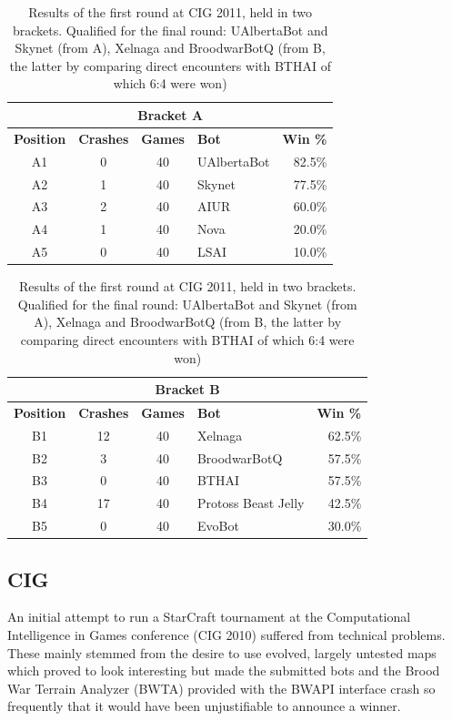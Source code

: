 \documentclass[journal]{IEEEtran}
\begin{document}
\begin{table}[!t]
\caption{Results of the first round at CIG 2011, held in two brackets.
Qualified for the final round: UAlbertaBot and Skynet (from A), Xelnaga
and BroodwarBotQ (from B, the latter by comparing direct encounters
with BTHAI of which 6:4 were won)}
\label{tab:cig-first-round}
\centering
\begin{tabular}{|c|c|c|l|r|}
\hline
\multicolumn{5}{|c|}{Bracket A} \\ \hline
{\bfseries Position} & {\bfseries Crashes} & {\bfseries Games} & {\bfseries Bot} & {\bfseries Win \%} \\
\hline
A1 & 0 &   40 &  UAlbertaBot & 82.5\% \\
A2 & 1 &     40 &  Skynet   &  77.5\% \\
A3 & 2 &   40 &  AIUR   &  60.0\% \\
A4 & 1 &   40 &  Nova   &  20.0\% \\
A5 & 0 &   40 &  LSAI   &  10.0\%\\
\hline
\end{tabular}
\begin{tabular}{|c|c|c|l|r|}
\hline
\multicolumn{5}{|c|}{Bracket B} \\ \hline
{\bfseries Position} & {\bfseries Crashes} & {\bfseries Games} & {\bfseries Bot} & {\bfseries Win \%} \\
\hline
B1 & 12 &  40 &  Xelnaga &   62.5\%\\
B2 & 3 &   40 &  BroodwarBotQ  &  57.5\%\\
B3 & 0 &   40 &  BTHAI    &  57.5\%\\
B4 & 17 &  40 &  Protoss Beast Jelly  & 42.5\%\\
B5 & 0 &   40 &  EvoBot   &  30.0\%\\
\hline
\end{tabular}
\end{table}

\subsection{CIG}
\label{sec:cig2011}

An initial attempt to run a StarCraft tournament at the Computational
Intelligence in Games conference (CIG 2010) suffered from technical problems.
These mainly stemmed from the desire to use evolved, largely untested
maps which proved to look interesting but made the submitted bots and the Brood War Terrain Analyzer (BWTA) provided with the BWAPI interface crash
so frequently that it would have been unjustifiable to announce a winner.
\end{document}
